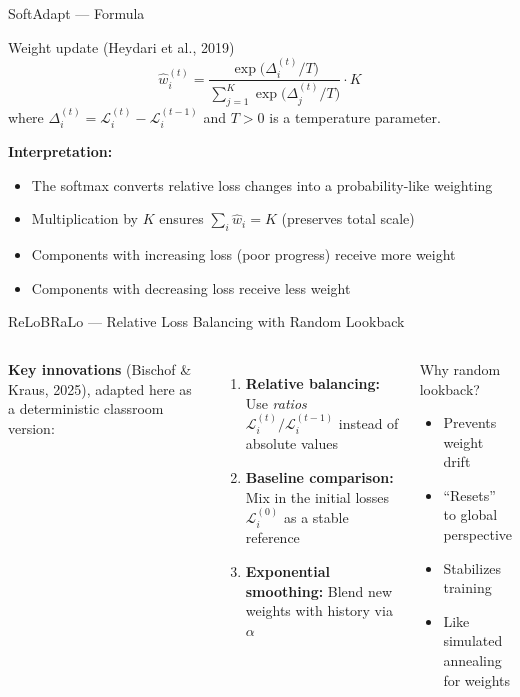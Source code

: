 \documentclass[aspectratio=169,11pt]{beamer}
\newcommand{\emphc}[1]{\textcolor{harvardcrimson}{#1}}
\begin{document}
\begin{frame}{SoftAdapt --- Formula}
\begin{block}{Weight update (Heydari et al., 2019)}
\[
    \hat{w}_i^{(t)} = \frac{\exp\!\bigl(\Delta_i^{(t)} / T\bigr)}{\sum_{j=1}^K \exp\!\bigl(\Delta_j^{(t)} / T\bigr)} \cdot K
\]
where $\Delta_i^{(t)} = \mathcal{L}_i^{(t)} - \mathcal{L}_i^{(t-1)}$ and $T > 0$ is a temperature parameter.
\end{block}

\vspace{0.3cm}
\textbf{Interpretation:}
\begin{itemize}
    \item The softmax converts relative loss changes into a probability-like weighting
    \item Multiplication by $K$ ensures $\sum_i \hat{w}_i = K$ (preserves total scale)
    \item Components with \emphc{increasing loss} (poor progress) receive more weight
    \item Components with decreasing loss receive less weight
\end{itemize}
\end{frame}

\begin{frame}{ReLoBRaLo --- Relative Loss Balancing with Random Lookback}
\begin{columns}[T]
\textbf{Key innovations} (Bischof \& Kraus, 2025), adapted here as a deterministic classroom version:

\vspace{0.2cm}
\begin{enumerate}
    \item \textbf{Relative balancing:} Use \emph{ratios} $\mathcal{L}_i^{(t)} / \mathcal{L}_i^{(t-1)}$ instead of absolute values

    \vspace{0.2cm}
    \item \textbf{Baseline comparison:} Mix in the \emphc{initial losses} $\mathcal{L}_i^{(0)}$ as a stable reference

    \vspace{0.2cm}
    \item \textbf{Exponential smoothing:} Blend new weights with history via $\alpha$
\end{enumerate}

\begin{block}{Why random lookback?}
\begin{itemize}
    \item Prevents weight drift
    \item ``Resets'' to global perspective
    \item Stabilizes training
    \item Like simulated annealing for weights
\end{itemize}
\end{block}
\end{columns}
\end{frame}
\end{document}
